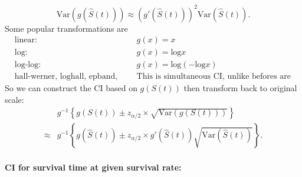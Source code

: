 \documentclass[a4paper,12pt]{article}
\begin{document}
\[
  \mathrm{Var}\left(g\left(\hat{S}\left(t\right)\right)\right)
  \approx
  \left(g'\left(\hat{S}\left(t\right)\right)\right)^2
  \mathrm{Var}\left(\hat{S}\left(t\right)\right)
  .
\]
Some popular transformations are
\[
  \begin{aligned}
    & \text{linear: }\quad && g\left(x\right) = x    \\
    & \text{log: }\quad && g\left(x\right) = \mathrm{log}x    \\
    & \text{log-log: }\quad && g\left(x\right) = \mathrm{log}\left(-\mathrm{log}x\right)    \\
    & \text{hall-werner, loghall, epband, logep: }\quad && \text{This is simultaneous CI, unlike befores are point-wise.}
  \end{aligned}
\]
So we can construct the CI based on $g\left(S\left(t\right)\right)$ then transform back to original scale:
\begin{equation}
  \label{eq:general_ci_for_st}
  \begin{aligned}
    & g^{-1}\left\{
      g\left(S\left(t\right)\right)
      \pm
      z_{\alpha / 2}
      \times \sqrt{
        \mathrm{Var}\left(g\left(S\left(t\right)\right)\right)
      }
    \right\}    \\
    \approx& g^{-1}\left\{
      g\left(\hat{S}\left(t\right)\right)
      \pm
      z_{\alpha / 2}
      \times
      g'\left(\hat{S}\left(t\right)\right)
      \sqrt{\mathrm{Var}\left(\hat{S}\left(t\right)\right)}
    \right\}
    .
  \end{aligned}
\end{equation}

\paragraph{CI for survival time at given survival rate: }
\end{document}
